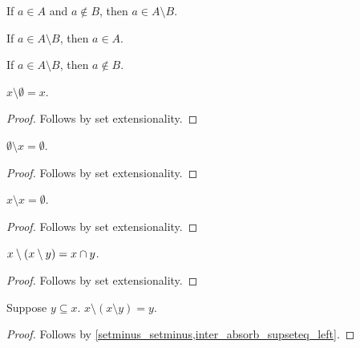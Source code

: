 \begin{proposition}\label{setminus_intro}
    If $a\in A$ and $a\notin B$, then $a\in A\setminus B$.
\end{proposition}

\begin{proposition}\label{setminus_elim_left}
    If $a\in A\setminus B$, then $a\in A$.
\end{proposition}

\begin{proposition}\label{setminus_elim_right}
    If $a\in A\setminus B$, then $a\notin B$.
\end{proposition}

\begin{proposition}\label{setminus_emptyset}
    $x\setminus \emptyset = x$.
\end{proposition}
\begin{proof}
    Follows by set extensionality.
\end{proof}

\begin{proposition}\label{emptyset_setminus}
    $\emptyset\setminus x = \emptyset$.
\end{proposition}
\begin{proof}
    Follows by set extensionality.
\end{proof}

\begin{proposition}\label{setminus_self}
    $x\setminus x = \emptyset$.
\end{proposition}
\begin{proof}
    Follows by set extensionality.
\end{proof}

\begin{proposition}\label{setminus_setminus}
    $x\setminus (x\setminus y) = x\cap y$.
\end{proposition}
\begin{proof}
    Follows by set extensionality.
\end{proof}

\begin{proposition}\label{double_relative_complement}
    Suppose $y\subseteq x$.
    $x\setminus (x\setminus y) = y$.
\end{proposition}
\begin{proof}
    Follows by \cref{setminus_setminus,inter_absorb_supseteq_left}.
\end{proof}

